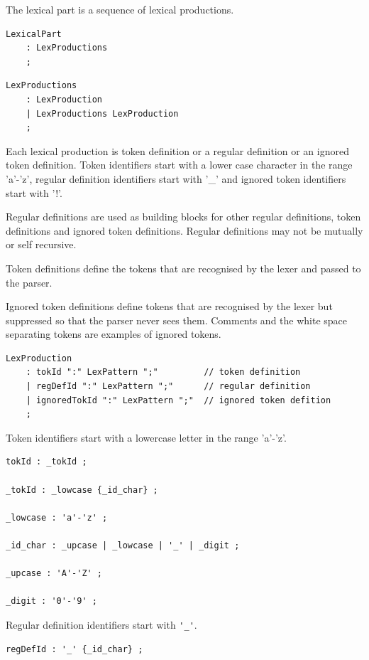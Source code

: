 \documentclass[12pt]{article}
\begin{document}
The lexical part is a sequence of lexical productions.

\begin{Verbatim}[frame=single]
LexicalPart    
    : LexProductions
    ;
\end{Verbatim}

\begin{Verbatim}[frame=single]
LexProductions    
    : LexProduction
    | LexProductions LexProduction
    ;
\end{Verbatim}

Each lexical production is token definition or a regular definition or an ignored token definition. Token identifiers start with a lower case character in the range 'a'-'z', regular definition identifiers start with '\_' and ignored token identifiers start with '!'. 

Regular definitions are used as building blocks for other regular definitions, token definitions and ignored token definitions. Regular definitions may not be mutually or self recursive.

Token definitions define the tokens that are recognised by the lexer and passed to the parser.

Ignored token definitions define tokens that are recognised by the lexer but suppressed so that the parser never sees them. Comments and the white space separating tokens are examples of ignored tokens.

\begin{Verbatim}[frame=single]
LexProduction 
    : tokId ":" LexPattern ";"         // token definition
    | regDefId ":" LexPattern ";"      // regular definition
    | ignoredTokId ":" LexPattern ";"  // ignored token defition
    ;
\end{Verbatim}

Token identifiers start with a lowercase letter in the range 'a'-'z'.

\begin{Verbatim}[frame=single]
tokId : _tokId ;

_tokId : _lowcase {_id_char} ;

_lowcase : 'a'-'z' ;

_id_char : _upcase | _lowcase | '_' | _digit ;

_upcase : 'A'-'Z' ;

_digit : '0'-'9' ;
\end{Verbatim}

Regular definition identifiers start with \verb|'_'|.

\begin{Verbatim}[frame=single]
regDefId : '_' {_id_char} ;
\end{Verbatim}
\end{document}

